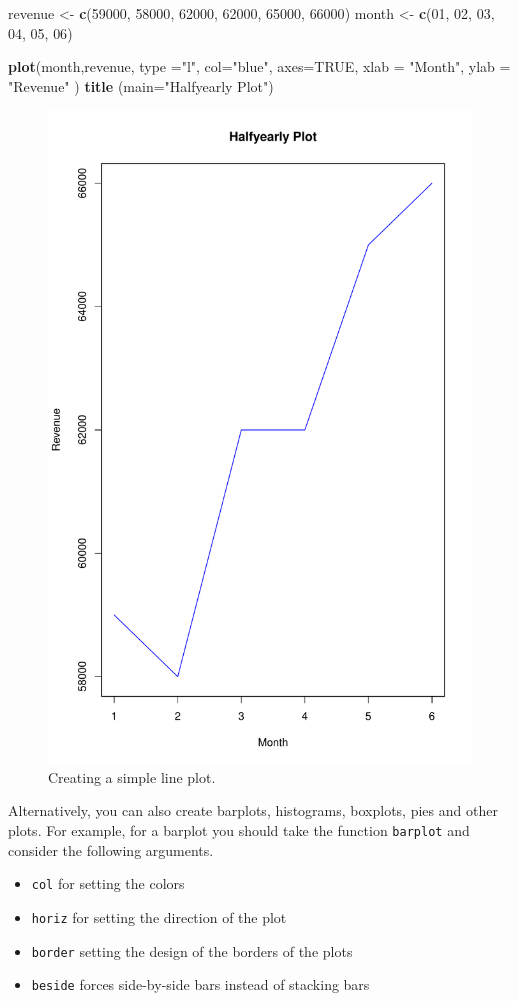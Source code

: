 \documentclass[]{report}
\newenvironment{Shaded}{\begin{snugshade}}{\end{snugshade}}
\newcommand{\KeywordTok}[1]{\textcolor[rgb]{0.13,0.29,0.53}{\textbf{#1}}}
\newcommand{\DataTypeTok}[1]{\textcolor[rgb]{0.13,0.29,0.53}{#1}}
\newcommand{\DecValTok}[1]{\textcolor[rgb]{0.00,0.00,0.81}{#1}}
\newcommand{\StringTok}[1]{\textcolor[rgb]{0.31,0.60,0.02}{#1}}
\newcommand{\OtherTok}[1]{\textcolor[rgb]{0.56,0.35,0.01}{#1}}
\newcommand{\NormalTok}[1]{#1}
\providecommand{\tightlist}{%
  \setlength{\itemsep}{0pt}\setlength{\parskip}{0pt}}
\begin{document}
\begin{Shaded}
\begin{Highlighting}[]
\NormalTok{revenue <-}\StringTok{ }\KeywordTok{c}\NormalTok{(}\DecValTok{59000}\NormalTok{, }\DecValTok{58000}\NormalTok{, }\DecValTok{62000}\NormalTok{, }\DecValTok{62000}\NormalTok{, }\DecValTok{65000}\NormalTok{, }\DecValTok{66000}\NormalTok{)}
\NormalTok{month <-}\StringTok{ }\KeywordTok{c}\NormalTok{(}\DecValTok{01}\NormalTok{, }\DecValTok{02}\NormalTok{, }\DecValTok{03}\NormalTok{, }\DecValTok{04}\NormalTok{, }\DecValTok{05}\NormalTok{, }\DecValTok{06}\NormalTok{)}

\KeywordTok{plot}\NormalTok{(month,revenue, }\DataTypeTok{type =}\StringTok{"l"}\NormalTok{, }\DataTypeTok{col=}\StringTok{"blue"}\NormalTok{,}
     \DataTypeTok{axes=}\OtherTok{TRUE}\NormalTok{,}
     \DataTypeTok{xlab =} \StringTok{"Month"}\NormalTok{,}
     \DataTypeTok{ylab =} \StringTok{"Revenue"}
\NormalTok{     )}
\KeywordTok{title}\NormalTok{ (}\DataTypeTok{main=}\StringTok{"Halfyearly Plot"}\NormalTok{)}
\end{Highlighting}
\end{Shaded}

\begin{figure}

{\centering \includegraphics[width=0.25\linewidth]{MyBook_files/figure-latex/simple-plots-2-1} 

}

\caption{Creating a simple line plot.}\label{fig:simple-plots-2}
\end{figure}

Alternatively, you can also create barplots, histograms, boxplots, pies
and other plots. For example, for a barplot you should take the function
\texttt{barplot} and consider the following arguments.

\begin{itemize}
\tightlist
\item
  \texttt{col} for setting the colors
\item
  \texttt{horiz} for setting the direction of the plot
\item
  \texttt{border} setting the design of the borders of the plots
\item
  \texttt{beside} forces side-by-side bars instead of stacking bars
\end{itemize}
\end{document}
